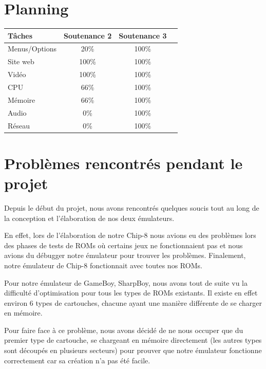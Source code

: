 \documentclass[12pt, a4paper]{article}
\begin{document}
\section{Planning}
\begin{center}
\begin{tabular}{|l|c|c|c|}
\hline
\bf Tâches          & \bf Soutenance 2      & \bf Soutenance 3  \\
\hline 
Menus/Options       &        20\%           & 100\%  \\
\hline 
Site web            &        100\%         & 100\%  \\
\hline 
Vidéo               &        100\%          & 100\%  \\
\hline 
CPU                 &        66\%          & 100\%  \\
\hline 
Mémoire             &        66\%         & 100\%  \\
\hline
Audio               &        0\%           & 100\%  \\
\hline
Réseau              &        0\%           & 100\%  \\

\hline
\end{tabular}
\end{center}
\pagebreak
\section{Problèmes rencontrés pendant le projet}

Depuis le début du projet, nous avons rencontrés quelques soucis tout au long de la conception et l'élaboration de nos deux émulateurs.

\bigskip
En effet, lors de l'élaboration de notre Chip-8 nous avions eu des problèmes lors des phases de tests de ROMs où certains jeux ne fonctionnaient pas et nous avions du débugger notre émulateur pour trouver les problèmes. Finalement, notre émulateur de Chip-8 fonctionnait avec toutes nos ROMs.

\bigskip
Pour notre émulateur de GameBoy, SharpBoy, nous avons tout de suite vu la difficulté d'optimisation pour tous les types de ROMs existants. Il existe en effet environ 6 types de cartouches, chacune ayant une manière différente de se charger en mémoire. 

Pour faire face à ce problème, nous avons décidé de ne nous occuper que du premier type de cartouche, se chargeant en mémoire directement (les autres types sont découpés en plusieurs secteurs) pour prouver que notre émulateur fonctionne correctement car sa création n'a pas été facile. 
\end{document}
